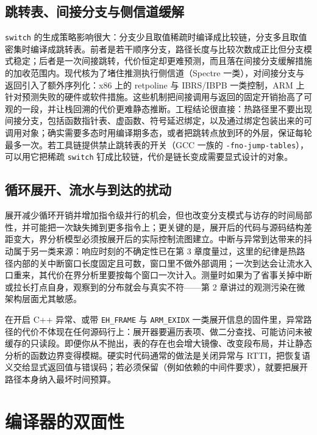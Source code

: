 \documentclass[12pt,a4paper,fontset=fandol]{ctexbook}
\newcommand{\Tp}[1]{\texttt{#1}}
\newcommand{\Lang}[1]{\textsf{#1}}
\begin{document}
\subsection{跳转表、间接分支与侧信道缓解}

\Tp{switch} 的生成策略影响很大：分支少且取值稀疏时编译成比较链，分支多且取值密集时编译成跳转表。前者是若干顺序分支，路径长度与比较次数成正比但分支模式稳定；后者是一次间接跳转，代价恒定却更难预测，而且落在间接分支缓解措施的加收范围内。现代核为了堵住推测执行侧信道（Spectre 一类），对间接分支与返回引入了额外序列化：x86 上的 retpoline 与 IBRS/IBPB 一类控制，ARM 上针对预测失败的硬件或软件措施。这些机制把间接调用与返回的固定开销抬高了可观的一段，并让栈回溯的代价更难静态推断。工程结论很直接：热路径里不要出现间接分支，包括函数指针表、虚函数、符号延迟绑定，以及通过绑定包装出来的可调用对象；确实需要多态时用编译期多态，或者把跳转点放到环的外层，保证每轮最多一次。若工具链提供禁止跳转表的开关（GCC 一族的 \Tp{-fno-jump-tables}），可以用它把稀疏 \Tp{switch} 钉成比较链，代价是链长变成需要显式设计的对象。

\subsection{循环展开、流水与到达的扰动}

展开减少循环开销并增加指令级并行的机会，但也改变分支模式与访存的时间局部性，并可能把一次缺失摊到更多指令上；更关键的是，展开后的代码与源码结构差距变大，界分析模型必须按展开后的实际控制流图建立。中断与异常到达带来的抖动属于另一类来源：响应时刻的不确定性已在第 3 章度量过，这里的纪律是热路径内部的关中断窗口长度固定且可数，窗口里不做外部调用；一次到达会让流水入口重来，其代价在界分析里要按每个窗口一次计入。测量时如果为了省事关掉中断或拉长打点自身，观察到的分布就会与真实不符——第 2 章讲过的观测污染在微架构层面尤其敏感。

\begin{warning}[title={异常表与栈展开是隐藏的控制流代价}]
在开启 \Lang{C++} 异常、或带 \Tp{EH\_FRAME} 与 \Tp{ARM\_EXIDX} 一类展开信息的固件里，异常路径的代价不体现在任何源码行上：展开器要遍历表项、做二分查找、可能访问未被缓存的只读段。即便你从不抛出，表的存在也会增大镜像、改变段布局，并让静态分析的函数边界变得模糊。硬实时代码通常的做法是关闭异常与 RTTI，把恢复语义交给显式返回值与错误码；若必须保留（例如依赖的中间件要求），就要把展开路径本身纳入最坏时间预算。
\end{warning}

\section{编译器的双面性}
\label{sec:ch13-compiler}
\end{document}
